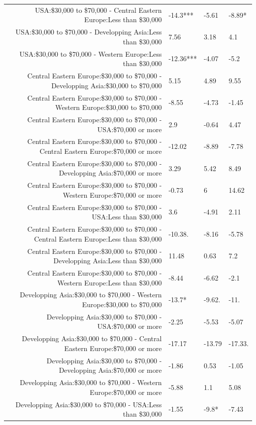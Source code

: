 \documentclass[]{report}
\begin{document}
\begin{table}[ht]
{\begin{tabular}{rlll}
		USA:\$30,000 to \$70,000 - Central Eastern Europe:Less than \$30,000 & -14.3*** & -5.61 & -8.89* \\ 
		USA:\$30,000 to \$70,000 - Developping Asia:Less than \$30,000 & 7.56 & 3.18 & 4.1 \\ 
		USA:\$30,000 to \$70,000 - Western Europe:Less than \$30,000 & -12.36*** & -4.07 & -5.2 \\ 
		Central Eastern Europe:\$30,000 to \$70,000 - Developping Asia:\$30,000 to \$70,000 & 5.15 & 4.89 & 9.55 \\ 
		Central Eastern Europe:\$30,000 to \$70,000 - Western Europe:\$30,000 to \$70,000 & -8.55 & -4.73 & -1.45 \\ 
		Central Eastern Europe:\$30,000 to \$70,000 - USA:\$70,000 or more & 2.9 & -0.64 & 4.47 \\ 
		Central Eastern Europe:\$30,000 to \$70,000 - Central Eastern Europe:\$70,000 or more & -12.02 & -8.89 & -7.78 \\ 
		Central Eastern Europe:\$30,000 to \$70,000 - Developping Asia:\$70,000 or more & 3.29 & 5.42 & 8.49 \\ 
		Central Eastern Europe:\$30,000 to \$70,000 - Western Europe:\$70,000 or more & -0.73 & 6 & 14.62 \\ 
		Central Eastern Europe:\$30,000 to \$70,000 - USA:Less than \$30,000 & 3.6 & -4.91 & 2.11 \\ 
		Central Eastern Europe:\$30,000 to \$70,000 - Central Eastern Europe:Less than \$30,000 & -10.38. & -8.16 & -5.78 \\ 
		Central Eastern Europe:\$30,000 to \$70,000 - Developping Asia:Less than \$30,000 & 11.48 & 0.63 & 7.2 \\ 
		Central Eastern Europe:\$30,000 to \$70,000 - Western Europe:Less than \$30,000 & -8.44 & -6.62 & -2.1 \\ 
		Developping Asia:\$30,000 to \$70,000 - Western Europe:\$30,000 to \$70,000 & -13.7* & -9.62. & -11. \\ 
		Developping Asia:\$30,000 to \$70,000 - USA:\$70,000 or more & -2.25 & -5.53 & -5.07 \\ 
		Developping Asia:\$30,000 to \$70,000 - Central Eastern Europe:\$70,000 or more & -17.17 & -13.79 & -17.33. \\ 
		Developping Asia:\$30,000 to \$70,000 - Developping Asia:\$70,000 or more & -1.86 & 0.53 & -1.05 \\ 
		Developping Asia:\$30,000 to \$70,000 - Western Europe:\$70,000 or more & -5.88 & 1.1 & 5.08 \\ 
		Developping Asia:\$30,000 to \$70,000 - USA:Less than \$30,000 & -1.55 & -9.8* & -7.43 \\ 

\end{tabular}}
\end{table}
\end{document}
